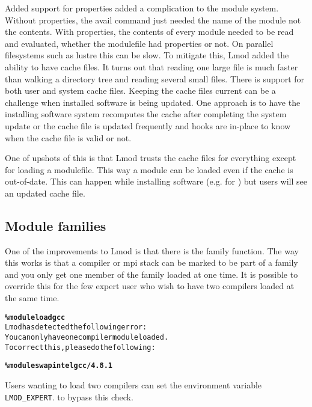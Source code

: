 Added support for properties added a complication to the module
system.  Without properties, the avail command just needed the name of
the module not the contents.  With properties, the contents of every
module needed to be read and evaluated, whether the modulefile had
properties or not. On parallel filesystems such as lustre this can be
slow.  To mitigate this, Lmod added the ability to have cache files.
It turns out that reading one large file is much faster than walking a
directory tree and reading several small files.  There is support for
both user and system cache files.  Keeping the cache files current can
be a challenge when installed software is being updated.  One approach
is to have the installing software system recomputes the cache after
completing the system update or the cache file is updated frequently
and hooks are in-place to know when the cache file is valid or not.

One of upshots of this is that Lmod trusts the cache files for
everything except for loading a modulefile.  This way a module can be
loaded even if the cache is out-of-date.  This can happen while
installing software (e.g. for \easybuild{}) but users will see an updated
cache file.


\subsection{Module families}

One of the improvements to Lmod is that there is the family function.
The way this works is that a compiler or mpi stack can be marked to be
part of a family and you only get one member of the family loaded at
one time.  It is possible to override this for the few expert user who
wish to have two compilers loaded at the same time.

{\small\begin{alltt}  \textbf{\% module load gcc}
  Lmod has detected the following error:
  You can only have one compiler module loaded.
  To correct this, please do the following:

  \textbf{\% module swap intel gcc/4.8.1}\end{alltt}}
\noindent
Users wanting to load two compilers can set the environment variable
\texttt{LMOD\_EXPERT}. to bypass this check.




